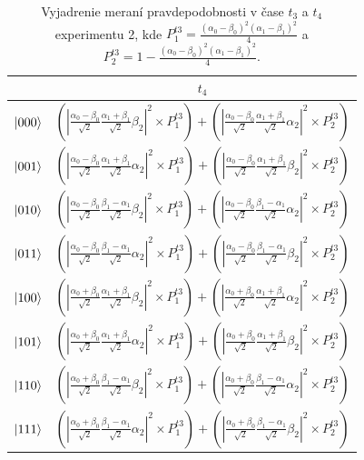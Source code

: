 \begin{table}
\begin{tabular}{|c|c|}
 & \(t_4\) \\
\hline
\(\ket{000}\) &
\((|\frac{\alpha_0 - \beta_0}{\sqrt{2}} \frac{\alpha_1 + \beta_1}{\sqrt{2}} \beta_2|^2 \times P^{t3}_1) + (|\frac{\alpha_0 - \beta_0}{\sqrt{2}} \frac{\alpha_1 + \beta_1}{\sqrt{2}} \alpha_2|^2 \times P^{t3}_2)\)  \\

\(\ket{001}\) & 
\((|\frac{\alpha_0 - \beta_0}{\sqrt{2}} \frac{\alpha_1 + \beta_1}{\sqrt{2}} \alpha_2|^2 \times P^{t3}_1) + (|\frac{\alpha_0 - \beta_0}{\sqrt{2}} \frac{\alpha_1 + \beta_1}{\sqrt{2}} \beta_2|^2 \times P^{t3}_2)\)  \\

\(\ket{010}\) &
\((|\frac{\alpha_0 - \beta_0}{\sqrt{2}} \frac{\beta_1 - \alpha_1}{\sqrt{2}} \beta_2|^2 \times P^{t3}_1) + (|\frac{\alpha_0 - \beta_0}{\sqrt{2}} \frac{\beta_1 - \alpha_1}{\sqrt{2}} \alpha_2|^2 \times P^{t3}_2)\)  \\

\(\ket{011}\) &
\((|\frac{\alpha_0 - \beta_0}{\sqrt{2}} \frac{\beta_1 - \alpha_1}{\sqrt{2}} \alpha_2|^2 \times P^{t3}_1) + (|\frac{\alpha_0 - \beta_0}{\sqrt{2}} \frac{\beta_1 - \alpha_1}{\sqrt{2}} \beta_2|^2 \times P^{t3}_2)\)  \\

\(\ket{100}\) &
\((|\frac{\alpha_0 + \beta_0}{\sqrt{2}} \frac{\alpha_1 + \beta_1}{\sqrt{2}} \beta_2|^2 \times P^{t3}_1) + (|\frac{\alpha_0 + \beta_0}{\sqrt{2}} \frac{\alpha_1 + \beta_1}{\sqrt{2}} \alpha_2|^2 \times P^{t3}_2)\)  \\

\(\ket{101}\) &
\((|\frac{\alpha_0 + \beta_0}{\sqrt{2}} \frac{\alpha_1 + \beta_1}{\sqrt{2}} \alpha_2|^2 \times P^{t3}_1) + (|\frac{\alpha_0 + \beta_0}{\sqrt{2}} \frac{\alpha_1 + \beta_1}{\sqrt{2}} \beta_2|^2 \times P^{t3}_2)\)  \\

\(\ket{110}\) &
\((|\frac{\alpha_0 + \beta_0}{\sqrt{2}} \frac{\beta_1 - \alpha_1}{\sqrt{2}} \beta_2|^2 \times P^{t3}_1) + (|\frac{\alpha_0 + \beta_0}{\sqrt{2}} \frac{\beta_1 - \alpha_1}{\sqrt{2}} \alpha_2|^2 \times P^{t3}_2)\)  \\

\(\ket{111}\) &
\((|\frac{\alpha_0 + \beta_0}{\sqrt{2}} \frac{\beta_1 - \alpha_1}{\sqrt{2}} \alpha_2|^2 \times P^{t3}_1) + (|\frac{\alpha_0 + \beta_0}{\sqrt{2}} \frac{\beta_1 - \alpha_1}{\sqrt{2}} \beta_2|^2 \times P^{t3}_2)\)  \\
\hline

\end{tabular}

\caption{\label{expr2_tanal34} Vyjadrenie meraní pravdepodobnosti v čase 
\(t_3\) a \(t_4\) experimentu 2, kde \(P^{t3}_1 = \frac{(\alpha_0 - \beta_0)^2(\alpha_1 - \beta_1)^2}{4}\) a \(P^{t3}_2 = 1 - \frac{(\alpha_0 - \beta_0)^2(\alpha_1 - \beta_1)^2}{4}\).}
\end{table}

